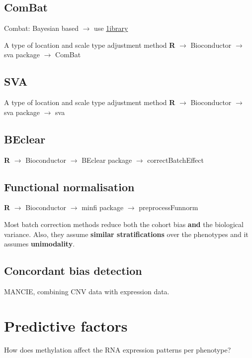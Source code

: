 \documentclass[a4paper,10pt]{article}
\begin{document}
\subsection{ComBat}
%
Combat: Bayesian based $\rightarrow$ use \href{http://www.bu.edu/jlab/wp-assets/ComBat/Abstract.html}{1ibrary} 

A type of location and scale type adjustment method
\textbf{R} $\rightarrow$ Bioconductor $\rightarrow$ sva package $\rightarrow$ ComBat

\subsection{SVA}
%
A type of location and scale type adjustment method
\textbf{R} $\rightarrow$ Bioconductor $\rightarrow$ sva package $\rightarrow$ sva


\subsection{BEclear}

\textbf{R} $\rightarrow$ Bioconductor $\rightarrow$ BEclear package $\rightarrow$ correctBatchEffect

\subsection{Functional normalisation}

\textbf{R} $\rightarrow$ Bioconductor $\rightarrow$ minfi package $\rightarrow$ preprocessFunnorm

Most batch correction methods reduce both the cohort bias \textbf{and} the biological variance.
Also, they assume \textbf{similar stratifications} over the phenotypes and it assumes \textbf{unimodality}.

\subsection{Concordant bias detection}
MANCIE, combining CNV data with expression data.

\section{Predictive factors}
%
How does methylation affect the RNA expression patterns per phenotype?






\end{document}

